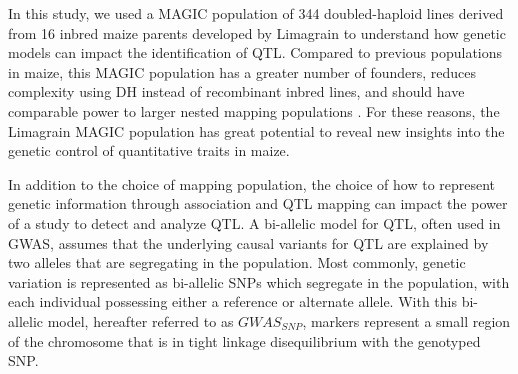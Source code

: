 \documentclass[article,9pt,twocolumn,twoside]{rilabRxiv}
\begin{document}
In this study, we used a MAGIC population of 344 doubled-haploid lines derived from 16 inbred maize parents developed by Limagrain to understand how genetic models can impact the identification of QTL.
Compared to previous populations in maize, this MAGIC population has a greater number of founders, reduces complexity using DH instead of recombinant inbred lines, and should have comparable power to larger nested mapping  populations \citep{DellAcqua,Yu2}.
For these reasons, the Limagrain MAGIC population has great potential to reveal new insights into the genetic control of quantitative traits in maize.

In addition to the choice of mapping population, the choice of how to represent genetic information through association and QTL mapping can impact the power of a study to detect and analyze QTL.
A bi-allelic model for QTL, often used in GWAS, assumes that the underlying causal variants for QTL are explained by two alleles that are segregating in the population.
Most commonly, genetic variation is represented as bi-allelic SNPs which segregate in the population, with each individual possessing either a reference or alternate allele.
With this bi-allelic model, hereafter referred to as $GWAS_{SNP}$, markers represent a small region of the chromosome that is in tight linkage disequilibrium with the genotyped SNP.
\end{document}
